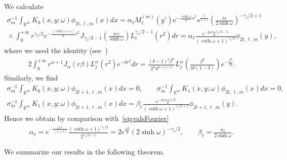 \documentclass[11pt]{article}
\numberwithin{equation}{section}
\numberwithin{theorem}{section}
\numberwithin{proposition}{section}
\numberwithin{lemma}{section}
\numberwithin{corollary}{section}
\numberwithin{definition}{section}
\numberwithin{example}{section}
\numberwithin{remark}{section}
\numberwithin{note}{section}
\theoremstyle{remark}
\newcommand{\mR}{\mathbb{R}}
\newcommand{\uy}{\underline{y}}
\def\a{{\alpha}}
\def\d{{\delta}}
\def\o{{\omega}}
\begin{document}
We calculate
\begin{gather*}
\sigma_{m}^{-1}\int_{\mR^{m}} K_{0}(x,y;\omega) \phi_{2t,\ell,m} (x)dx = \alpha_{\ell}
M_{\ell}^{(m)}(\uy') e^{-\frac{\coth{\o}}{2}s^{2}}s^{\frac{\ell}{1+c}}\left( \frac{i s}{2
\sinh{\o}}\right)^{-\gamma_{\ell}/2+1}\\
{}
\times \int_{0}^{+\infty} r^{\gamma_{\ell}/2} e^{-\frac{(\coth{\o}+1)}{2}r^{2}}
J_{\gamma_{\ell}/2 -1} \left( \frac{i r s}{\sinh{\o}}\right)L_{t}^{\gamma_{\ell}/2-1}(r^{2}) dr
=\alpha_{\ell} \frac{e^{-2\o t} 2^{\gamma_{\ell}/2-1}}{(\coth{\o}+1)^{\gamma_{\ell}/2}}
\phi_{2t,\ell,m}(y),
\end{gather*}
where we used the identity (see~\cite[Corollary 4.6]{Orsted2})
\begin{gather*}
2\int_{0}^{+\infty}r^{\alpha+1}J_{\a}(r\beta)L_{j}^{\a}(r^{2})e^{-\d r^{2}}dr=
\frac{(\d-1)^{j}\beta^{\alpha}}{2^{\alpha}\d^{\alpha+j+1}}L_{j}^{\a}\left(\frac{\beta^{2}}{4
\d(1-\d)}\right)e^{-\frac{\beta^{2}}{4\d}}.
\end{gather*}
Similarly, we f\/ind
\begin{gather*}
\sigma_{m}^{-1} \int_{\mR^{m}} K_{0}(x,y;\omega) \phi_{2t+1,\ell,m}(x) dx = 0,\qquad
\sigma_{m}^{-1} \int_{\mR^{m}} K_{1}(x,y;\omega) \phi_{2t,\ell,m} (x)dx = 0,\\
\sigma_{m}^{-1} \int_{\mR^{m}} K_{1}(x,y;\omega) \phi_{2t+1,\ell,m} (x) dx = \beta_{\ell}
\frac{e^{-2\o t} 2^{\gamma_{\ell}/2}}{(\coth{\o}+1)^{\gamma_{\ell}/2+1}} \phi_{2t+1,\ell,m}(y).
\end{gather*}
Hence we obtain by comparison with~\eqref{eigvalsFourier}
\begin{gather*}
\alpha_{\ell} = e^{-\frac{\o \ell}{(1+c)}}
\frac{(\coth{\o}+1)^{\gamma_{\ell}/2}}{2^{\gamma_{\ell}/2-1}} = 2 e^{\frac{\o \d}{2}} (2
\sinh{\o})^{-\gamma_{\ell}/2},\qquad
\beta_{\ell} = \frac{ \alpha_{\ell}}{2\sinh{\o}}.
\end{gather*}

We summarize our results in the following theorem.
\end{document}
